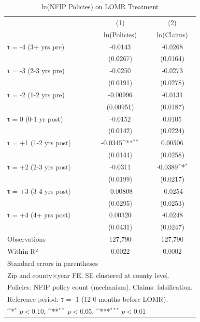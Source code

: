 \begin{table}[htbp]\centering
\def\sym#1{\ifmmode^{#1}\else\(^{#1}\)\fi}
\caption{ln(NFIP Policies) on LOMR Treatment}
\begin{tabular}{l*{2}{c}}
\hline\hline
                    &\multicolumn{1}{c}{(1)}&\multicolumn{1}{c}{(2)}\\
                    &\multicolumn{1}{c}{ln(Policies)}&\multicolumn{1}{c}{ln(Claims)}\\
\hline
τ = -4 (3+ yrs pre) &     -0.0143         &     -0.0268         \\
                    &    (0.0267)         &    (0.0164)         \\
[1em]
τ = -3 (2-3 yrs pre)&     -0.0250         &     -0.0273         \\
                    &    (0.0191)         &    (0.0278)         \\
[1em]
τ = -2 (1-2 yrs pre)&    -0.00996         &     -0.0131         \\
                    &   (0.00951)         &    (0.0187)         \\
[1em]
τ = 0 (0-1 yr post) &     -0.0152         &      0.0105         \\
                    &    (0.0142)         &    (0.0224)         \\
[1em]
τ = +1 (1-2 yrs post)&     -0.0345\sym{**} &     0.00506         \\
                    &    (0.0144)         &    (0.0258)         \\
[1em]
τ = +2 (2-3 yrs post)&     -0.0311         &     -0.0389\sym{*}  \\
                    &    (0.0199)         &    (0.0217)         \\
[1em]
τ = +3 (3-4 yrs post)&    -0.00808         &     -0.0254         \\
                    &    (0.0295)         &    (0.0253)         \\
[1em]
τ = +4 (4+ yrs post)&     0.00320         &     -0.0248         \\
                    &    (0.0431)         &    (0.0247)         \\
\hline
Observations        &     127,790         &     127,790         \\
Within R²           &      0.0022         &      0.0002         \\
\hline\hline
\multicolumn{3}{l}{\footnotesize Standard errors in parentheses}\\
\multicolumn{3}{l}{\footnotesize Zip and county×year FE. SE clustered at county level.}\\
\multicolumn{3}{l}{\footnotesize Policies: NFIP policy count (mechanism). Claims: falsification.}\\
\multicolumn{3}{l}{\footnotesize Reference period: τ = -1 (12-0 months before LOMR).}\\
\multicolumn{3}{l}{\footnotesize \sym{*} \(p<0.10\), \sym{**} \(p<0.05\), \sym{***} \(p<0.01\)}\\
\end{tabular}
\end{table}
